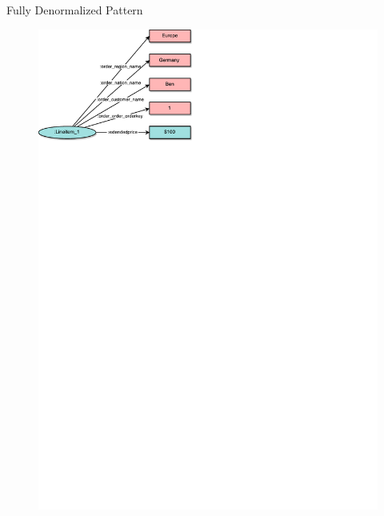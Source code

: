 \begin{frame}{\patsec}{Fully Denormalized Pattern}
    \begin{figure}
        \includegraphics[trim=0 648 255 0,clip,width=1\textwidth]{images/denormalizedpattern.pdf}
    \end{figure}
\end{frame}

